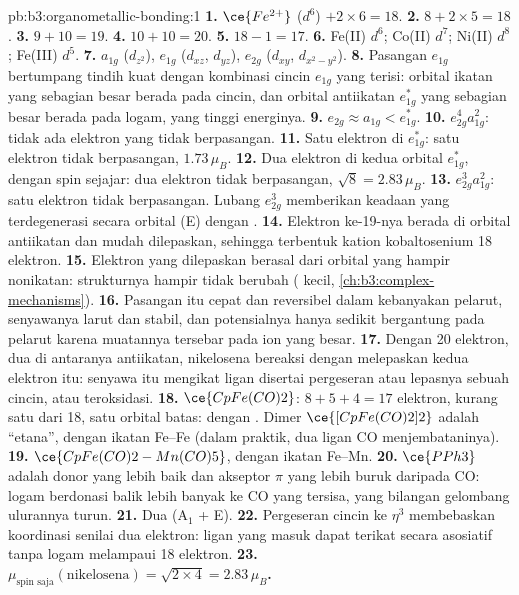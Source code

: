 \begin{solution}{pb:b3:organometallic-bonding:1}
\textbf{1.} $\ce{Fe^{2+}}$ ($d^6$) $+ 2 \times 6 = 18$.
\textbf{2.} $8 + 2 \times 5 = 18$.
\textbf{3.} $9 + 10 = 19$.
\textbf{4.} $10 + 10 = 20$.
\textbf{5.} $18 - 1 = 17$.
\textbf{6.} Fe(II) $d^6$; Co(II) $d^7$; Ni(II) $d^8$; Fe(III) $d^5$.
\textbf{7.} $a_{1g}$ ($d_{z^2}$), $e_{1g}$ ($d_{xz}$, $d_{yz}$), $e_{2g}$ ($d_{xy}$, $d_{x^2-y^2}$).
\textbf{8.} Pasangan $e_{1g}$ bertumpang tindih kuat dengan kombinasi cincin $e_{1g}$ yang terisi: orbital
ikatan yang sebagian besar berada pada cincin, dan orbital antiikatan $e_{1g}^\ast$ yang sebagian besar berada pada logam, yang tinggi
energinya.
\textbf{9.} $e_{2g} \approx a_{1g} < e_{1g}^\ast$.
\textbf{10.} $e_{2g}^4a_{1g}^2$: tidak ada elektron yang tidak berpasangan.
\textbf{11.} Satu elektron di $e_{1g}^\ast$: satu elektron tidak berpasangan, $1.73\,\mu_B$.
\textbf{12.} Dua elektron di kedua orbital $e_{1g}^\ast$, dengan spin sejajar: dua elektron tidak berpasangan, $\sqrt{8} =
2.83\,\mu_B$.
\textbf{13.} $e_{2g}^3a_{1g}^2$: satu elektron tidak berpasangan. Lubang $e_{2g}^3$ memberikan keadaan yang
terdegenerasi secara orbital (E) dengan .
\textbf{14.} Elektron ke-19-nya berada di orbital antiikatan dan mudah dilepaskan,
sehingga terbentuk kation kobaltosenium 18 elektron.
\textbf{15.} Elektron yang dilepaskan berasal dari orbital yang hampir nonikatan:
strukturnya hampir tidak berubah ( kecil, \cref{ch:b3:complex-mechanisms}).
\textbf{16.} Pasangan itu cepat dan reversibel dalam kebanyakan pelarut, senyawanya
larut dan stabil, dan potensialnya hanya sedikit bergantung pada pelarut karena
muatannya tersebar pada ion yang besar.
\textbf{17.} Dengan 20 elektron, dua di antaranya antiikatan, nikelosena bereaksi dengan melepaskan kedua elektron itu:
senyawa itu mengikat ligan disertai pergeseran atau lepasnya sebuah cincin, atau teroksidasi.
\textbf{18.} $\ce{CpFe(CO)2}$: $8 + 5 + 4 = 17$ elektron, kurang satu dari 18, satu orbital batas: 
dengan . Dimer $\ce{[CpFe(CO)2]2}$ adalah ``etana'', dengan ikatan Fe--Fe (dalam praktik, dua ligan CO
menjembataninya).
\textbf{19.} $\ce{CpFe(CO)2-Mn(CO)5}$, dengan ikatan Fe--Mn.
\textbf{20.} $\ce{PPh3}$ adalah donor yang lebih baik dan akseptor $\pi$ yang lebih buruk daripada CO: logam berdonasi balik
lebih banyak ke CO yang tersisa, yang bilangan gelombang ulurannya turun.
\textbf{21.} Dua (A$_1$ + E).
\textbf{22.} Pergeseran cincin ke $\eta^3$ membebaskan koordinasi senilai dua elektron: ligan yang masuk
dapat terikat secara asosiatif tanpa logam melampaui 18 elektron.
\textbf{23.} \textbf{$\mu_{\text{spin saja}}(\text{nikelosena}) = \sqrt{2 \times 4} = 2.83\,\mu_B$.}
\end{solution}

